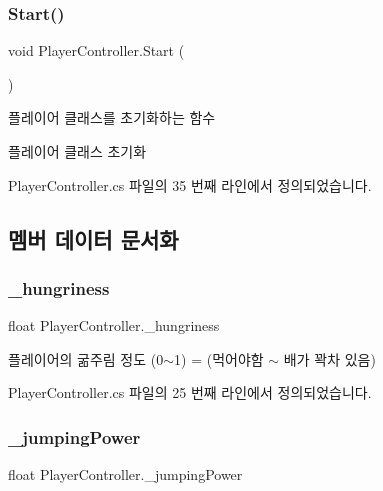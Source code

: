 \subsubsection{\texorpdfstring{Start()}{Start()}}
{\footnotesize\ttfamily void Player\+Controller.\+Start (\begin{DoxyParamCaption}{ }\end{DoxyParamCaption})\hspace{0.3cm}{\ttfamily [private]}}



플레이어 클래스를 초기화하는 함수 

플레이어 클래스 초기화 

Player\+Controller.\+cs 파일의 35 번째 라인에서 정의되었습니다.


\begin{DoxyCode}{0}

\end{DoxyCode}


\subsection{멤버 데이터 문서화}
\mbox{\label{class_player_controller_ab4fed78a016e8baca12e50bb3d7f034a}} 
\subsubsection{\texorpdfstring{\_hungriness}{\_hungriness}}
{\footnotesize\ttfamily float Player\+Controller.\+\_\+hungriness}



플레이어의 굶주림 정도 (0$\sim$1) = (먹어야함 $\sim$ 배가 꽉차 있음) 



Player\+Controller.\+cs 파일의 25 번째 라인에서 정의되었습니다.

\mbox{\label{class_player_controller_ad5b01cf8e0c714d76cbd667d4fab7c25}} 
\subsubsection{\texorpdfstring{\_jumpingPower}{\_jumpingPower}}
{\footnotesize\ttfamily float Player\+Controller.\+\_\+jumping\+Power}



